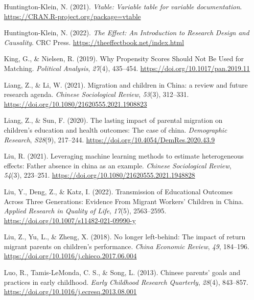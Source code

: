 \documentclass[
  man,floatsintext]{apa7}
\newlength{\cslhangindent}
\newlength{\cslentryspacingunit} %
\newenvironment{CSLReferences}[2] %
 {%
  \setlength{\parindent}{0pt}
  \ifodd #1
  \let\oldpar\par
  \def\par{\hangindent=\cslhangindent\oldpar}
  \fi
  \setlength{\parskip}{#2\cslentryspacingunit}
 }%
 {}
\begin{document}
\begin{CSLReferences}{1}{0}
\leavevmode{}%
Huntington-Klein, N. (2021). \emph{Vtable: Variable table for variable documentation}. \url{https://CRAN.R-project.org/package=vtable}

\leavevmode{}%
Huntington-Klein, N. (2022). \emph{The Effect: An Introduction to Research Design and Causality}. CRC Press. \url{https://theeffectbook.net/index.html}

\leavevmode{}%
King, G., \& Nielsen, R. (2019). Why Propensity Scores Should Not Be Used for Matching. \emph{Political Analysis}, \emph{27}(4), 435--454. \url{https://doi.org/10.1017/pan.2019.11}

\leavevmode{}%
Liang, Z., \& Li, W. (2021). Migration and children in China: a review and future research agenda. \emph{Chinese Sociological Review}, \emph{53}(3), 312--331. \url{https://doi.org/10.1080/21620555.2021.1908823}

\leavevmode{}%
Liang, Z., \& Sun, F. (2020). The lasting impact of parental migration on children's education and health outcomes: The case of china. \emph{Demographic Research}, \emph{S28}(9), 217--244. \url{https://doi.org/10.4054/DemRes.2020.43.9}

\leavevmode{}%
Liu, R. (2021). Leveraging machine learning methods to estimate heterogeneous effects: Father absence in china as an example. \emph{Chinese Sociological Review}, \emph{54}(3), 223--251. \url{https://doi.org/10.1080/21620555.2021.1948828}

\leavevmode{}%
Liu, Y., Deng, Z., \& Katz, I. (2022). Transmission of Educational Outcomes Across Three Generations: Evidence From Migrant Workers{'} Children in China. \emph{Applied Research in Quality of Life}, \emph{17}(5), 2563--2595. \url{https://doi.org/10.1007/s11482-021-09990-y}

\leavevmode{}%
Liu, Z., Yu, L., \& Zheng, X. (2018). No longer left-behind: The impact of return migrant parents on children's performance. \emph{China Economic Review}, \emph{49}, 184--196. \url{https://doi.org/10.1016/j.chieco.2017.06.004}

\leavevmode{}%
Luo, R., Tamis-LeMonda, C. S., \& Song, L. (2013). Chinese parents{'} goals and practices in early childhood. \emph{Early Childhood Research Quarterly}, \emph{28}(4), 843--857. \url{https://doi.org/10.1016/j.ecresq.2013.08.001}


\end{CSLReferences}
\end{document}

